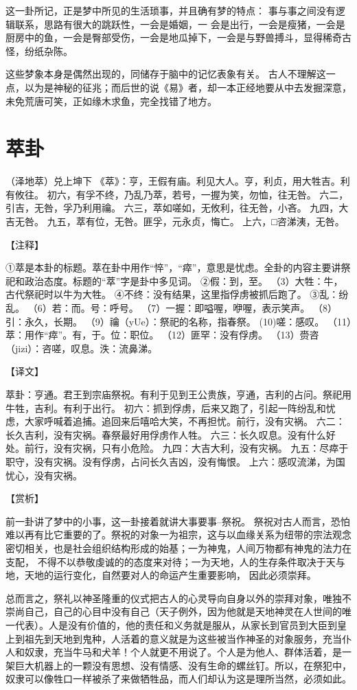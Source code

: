 \documentclass[12pt,UTF8]{ctexbook}
\begin{document}
这一卦所记，正是梦中所见的生活琐事，并且确有梦的特点： 事与事之间没有逻辑联系，思路有很大的跳跃性，一会是婚姻，一 会是出行，一会是瘦猪，一会是厨房中的鱼，一会是臀部受伤，一会是地瓜掉下，一会是与野兽搏斗，显得稀奇古怪，纷纸杂陈。

这些梦象本身是偶然出现的，同储存于脑中的记忆表象有关。 古人不理解这一点，以为是神秘的征兆；而后世的说《易》者，却一本正经地要从中去发掘深意，未免荒唐可笑，正如缘木求鱼，完全找错了地方。

\chapter{萃卦}

（泽地萃）兑上坤下
《萃》：亨，王假有庙。利见大人。亨，利贞，用大牲吉。利有攸往。
初六，有孚不终，乃乱乃萃，若号，一握为笑，勿恤，往无咎。
六二，引吉，无咎，孚乃利用禴。
六三，萃如嗟如，无攸利，往无咎，小吝。
九四，大吉无咎。
九五，萃有位，无咎。匪孚，元永贞，悔亡。
上六，□咨涕洟，无咎。

【注释】

①萃是本卦的标题。萃在卦中用作“悴”，“瘁”，意思是忧虑。全卦的内容主要讲祭祀和政治态度。标题的“萃”字是卦中多见词。
②假：到，至。
（3）大牲：牛，古代祭祀时以牛为大牲。
④不终：没有结果，这里指俘虏被抓后跑了。
③乱：纷乱。
（6）若：而。号：呼号。
（7）一握：即嗌喔，咿喔，表示笑声。
（8）引：永久，长期。
（9）禴（yUe）：祭祀的名称，指春祭。
(10)嗟：感叹。
（11）萃：用作“瘁”。有，于。位：职位。
（12）匪罕：没有俘虏。
（13）赍咨（jizi）：咨嗟，叹息。泆：流鼻涕。

【译文】

萃卦：亨通。君王到宗庙祭祝。有利于见到王公贵族，亨通，吉利的占问。祭祀用牛牲，吉利。有利于出行。
初六：抓到俘虏，后来又跑了，引起一阵纷乱和忧虑，大家呼喊着追捕。追回来后嘻哈大笑，不再担忧。前行，没有灾祸。
六二：长久吉利，没有灾祸。春祭最好用俘虏作人牲。
六三：长久叹息。没有什么好处。前行，没有灾祸，只有小危险。
九四：大吉大利，没有灾祸。
九五：尽瘁于职守，没有灾祸。没有俘虏，占问长久吉凶，没有悔恨。
上六：感叹流涕，为国忧心，没有灾祸。

【赏析】

前一卦讲了梦中的小事，这一卦接着就讲大事要事--祭祝。 祭祝对古人而言，恐怕难以再有比它重要的了。祭祝的对象一为祖宗，这与以血缘关系为纽带的宗法观念密切相关，也是社会组织结构形成的始基；一为神鬼，人间万物都有神鬼的法力在支配， 不得不以恭敬虔诚的的态度来对待；一为天地，人的生存条件取决于天与地，天地的运行变化，自然要对人的命运产生重要影响， 因此必须崇拜。

总而言之，祭礼以神圣隆重的仪式把古人的心灵导向自身以外的崇拜对象，唯独不崇尚自己，自己的心目中没有自己（天子例外，因为他就是天地神灵在人世间的唯一代表）。人是没有价值的，他的责任和义务就是服从，从家长到官员到大臣到皇上到祖先到天地到鬼种，人活着的意义就是为这些被当作神圣的对象服务，充当仆人和奴隶，充当牛马和犬羊！个人就更不用说了。个人是为他人、群体活着，是一架巨大机器上的一颗没有思想、没有情感、没有生命的螺丝钉。所以，在祭犯中，奴隶可以像牲口一样被杀了来做牺牲品，而人们却认为这是理所当然，必须如此。
\end{document}
